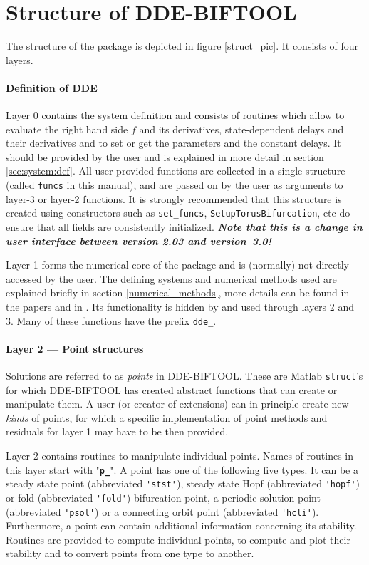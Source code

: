 \documentclass[10pt]{scrartcl}
\newcommand{\DDEBIFCODE}{\textsc{DDE-BIFTOOL}}
\newcommand{\file}[1]{\textbf{\texttt{#1}}}
\newcommand{\blist}[1]{\mbox{\lstinline!#1!}}
\begin{document}
\section{Structure of {\DDEBIFCODE}}\label{code_struct}

The structure of the package is depicted in figure \ref{struct_pic}.
It consists of four layers. 

\paragraph{Definition of DDE}
Layer 0 contains the system definition and consists of routines which
allow to evaluate the right hand side $f$ and its derivatives,
state-dependent delays and their derivatives and to set or get the
parameters and the constant delays.  It should be provided by the user
and is explained in more detail in section \ref{sec:system:def}.  All
user-provided functions are collected in a single structure (called
\blist{funcs} in this manual), and are passed on by the user as
arguments to layer-3 or layer-2 functions. It is strongly recommended
that this structure is created using constructors such as
\blist{set_funcs}, \blist{SetupTorusBifurcation}, etc do ensure that
all fields are consistently initialized. \textbf{\emph{Note that this
    is a change in user interface between version 2.03 and
    version~3.0!}}

Layer 1 forms the numerical core of the package and is (normally) not
directly accessed by the user. The defining systems and numerical
methods used are explained briefly in section \ref{numerical_methods},
more details can be found in the papers
\cite{Luzy96,Enge99a,Enge99b,en_d01,engel01,luz01,homoclinic} and in
\cite{Enge00}. Its functionality is hidden by and used through layers
2 and 3. Many of these functions have the prefix \blist{dde_}.

\paragraph{Layer 2 --- Point structures}
Solutions are referred to as \emph{points} in \DDEBIFCODE{}. These are
Matlab \texttt{struct}'s for which \DDEBIFCODE{} has created abstract
functions that can create or manipulate them. A user (or creator of
extensions) can in principle create new \emph{kinds} of points, for
which a specific implementation of point methods and residuals for
layer 1 may have to be then provided.

Layer 2 contains routines to manipulate individual points.  Names of
routines in this layer start with "\file{p\_}".  A point has one of
the following five types.  It can be a steady state point (abbreviated
\blist{'stst'}), steady state Hopf (abbreviated \blist{'hopf'}) or
fold (abbreviated \blist{'fold'}) bifurcation point, a periodic solution point
(abbreviated \blist{'psol'}) or a connecting orbit point (abbreviated
\blist{'hcli'}). Furthermore, a point can contain additional information
concerning its stability.  Routines are provided to compute individual
points, to compute and plot their stability and to convert points from
one type to another.
\end{document}
